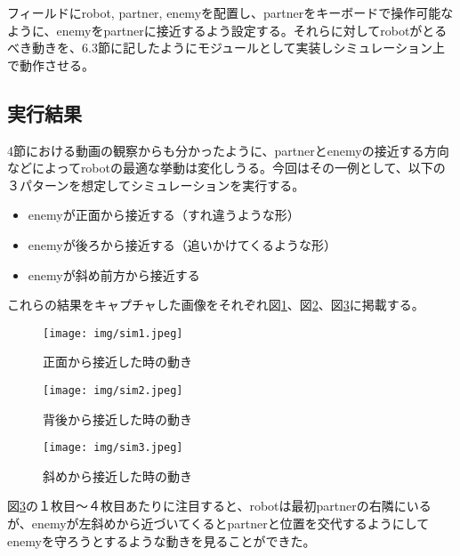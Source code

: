 \documentclass{kuisthesis}
\begin{document}
フィールドにrobot, partner, enemyを配置し、partnerをキーボードで操作可能なように、enemyをpartnerに接近するよう設定する。それらに対してrobotがとるべき動きを、6.3節に記したようにモジュールとして実装しシミュレーション上で動作させる。


\subsection{実行結果}

4節における動画の観察からも分かったように、partnerとenemyの接近する方向などによってrobotの最適な挙動は変化しうる。今回はその一例として、以下の３パターンを想定してシミュレーションを実行する。

\begin{itemize}
	\item enemyが正面から接近する（すれ違うような形）
	\item enemyが後ろから接近する（追いかけてくるような形）
	\item enemyが斜め前方から接近する
\end{itemize}

これらの結果をキャプチャした画像をそれぞれ図\ref{fig:sim1}、図\ref{fig:sim2}、図\ref{fig:sim3}に掲載する。

\begin{figure}[p]\begin{center}
	\texttt{[image: img/sim1.jpeg]}
	\caption{正面から接近した時の動き}
	\label{fig:sim1}
\end{center}\end{figure}

\begin{figure}[p]\begin{center}
	\texttt{[image: img/sim2.jpeg]}
	\caption{背後から接近した時の動き}
	\label{fig:sim2}
\end{center}\end{figure}

\begin{figure}[p]\begin{center}
	\texttt{[image: img/sim3.jpeg]}
	\caption{斜めから接近した時の動き}
	\label{fig:sim3}
\end{center}\end{figure}

図\ref{fig:sim3}の１枚目〜４枚目あたりに注目すると、robotは最初partnerの右隣にいるが、enemyが左斜めから近づいてくるとpartnerと位置を交代するようにしてenemyを守ろうとするような動きを見ることができた。
\end{document}
